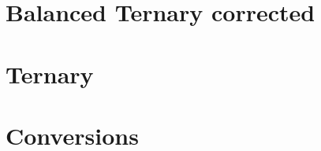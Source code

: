\documentclass[11pt,a4paper]{article}
\author{Christian Rinderknecht}
\date{17 October 2007}
\begin{document}
\maketitle
\thispagestyle{empty}

\allowdisplaybreaks

\section{Balanced Ternary corrected}




\section{Ternary}



\section{Conversions}


\end{document}
